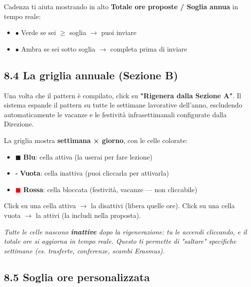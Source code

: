 \documentclass[11pt,a4paper]{article}
\renewenvironment{quote}
  {\begin{list}{}{%
      \setlength{\leftmargin}{8pt}%
      \setlength{\rightmargin}{8pt}%
      \setlength{\topsep}{6pt}%
      \setlength{\parsep}{0pt}}%
      \item\relax\color{black!75}\itshape}
  {\end{list}}
\begin{document}
Cadenza ti aiuta mostrando in alto \textbf{Totale ore proposte / Soglia annua} in tempo reale:

\begin{itemize}
  \item \textcolor{green!60!black}{$\bullet$} Verde se sei $\geq$ soglia $\rightarrow$ puoi inviare
  \item \textcolor{yellow!70!black}{$\bullet$} Ambra se sei sotto soglia $\rightarrow$ completa prima di inviare
\end{itemize}

\subsection{8.4 La griglia annuale (Sezione B)}


Una volta che il pattern è compilato, click su \textbf{"Rigenera dalla Sezione A"}. Il sistema espande il pattern su tutte le settimane lavorative dell'anno, escludendo automaticamente le vacanze e le festività infrasettimanali configurate dalla Direzione.

La griglia mostra \textbf{settimana × giorno}, con le celle colorate:

\begin{itemize}
  \item \textcolor{blue!60!white}{$\blacksquare$} \textbf{Blu}: cella attiva (la userai per fare lezione)
  \item \textcolor{black!30}{$\square$} \textbf{Vuota}: cella inattiva (puoi cliccarla per attivarla)
  \item \textcolor{red}{$\blacksquare$} \textbf{Rossa}: cella bloccata (festività, vacanze --- non cliccabile)
\end{itemize}

Click su una cella attiva $\rightarrow$ la disattivi (libera quelle ore).   Click su una cella vuota $\rightarrow$ la attivi (la includi nella proposta).

\begin{quote}
Tutte le celle nascono \textbf{inattive} dopo la rigenerazione: tu le accendi cliccando, e il totale ore si aggiorna in tempo reale. Questo ti permette di "saltare" specifiche settimane (es. trasferte, conferenze, scambi Erasmus).
\end{quote}

\subsection{8.5 Soglia ore personalizzata}
\end{document}
